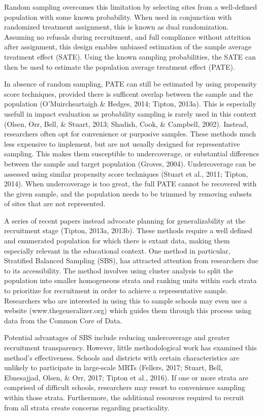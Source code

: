 \documentclass[man,floatsintext]{apa6}
\theoremstyle{definition}
\theoremstyle{definition}
\theoremstyle{definition}
\theoremstyle{remark}
\begin{document}
Random sampling overcomes this limitation by selecting sites from a
well-defined population with some known probability. When used in
conjunction with randomized treatment assignment, this is known as dual
randomization. Assuming no refusals during recruitment, and full
compliance without attrition after assignment, this design enables
unbiased estimation of the sample average treatment effect (SATE). Using
the known sampling probabilities, the SATE can then be used to estimate
the population average treatment effect (PATE).

In absence of random sampling, PATE can still be estimated by using
propensity score techniques, provided there is sufficent overlap between
the sample and the population (O'Muircheartaigh \& Hedges, 2014; Tipton,
2013a). This is especially usefull in impact evaluation as probability
sampling is rarely used in this context (Olsen, Orr, Bell, \& Stuart,
2013; Shadish, Cook, \& Campbell, 2002). Instead, researchers often opt
for convenience or purposive samples. These methods much less expensive
to implement, but are not usually designed for representative sampling.
This makes them susceptible to undercoverage, or substantial differencs
between the sample and target population (Groves, 2004). Undercoverage
can be assessed using similar propensity score techniques (Stuart et
al., 2011; Tipton, 2014). When undercoverage is too great, the full PATE
cannot be recovered with the given sample, and the population needs to
be trimmed by removing subsets of sites that are not represented.

A series of recent papers instead advocate planning for generalizability
at the recruitment stage (Tipton, 2013a, 2013b). These methods require a
well defined and enumerated population for which there is extant data,
making them especially relevant in the educational context. One method
in particular, Stratified Balanced Sampling (SBS), has attracted
attention from researchers due to its accessibility. The method involves
using cluster analysis to split the population into smaller homogeneous
strata and ranking units within each strata to prioritize for
recruitment in order to achieve a representative sample. Researchers who
are interested in using this to sample schools may even use a website
(www.thegeneralizer.org) which guides them through this process using
data from the Common Core of Data.

Potential advantages of SBS include reducing undercoverage and greater
recruitment transparency. However, little methodological work has
examined this method's effectiveness. Schools and districts with certain
characteristics are unlikely to participate in large-scale MRTs
(Fellers, 2017; Stuart, Bell, Ebnesajjad, Olsen, \& Orr, 2017; Tipton et
al., 2016). If one or more strata are comprised of difficult schools,
researchers may resort to convenience sampling within those strata.
Furthermore, the additional resources required to recruit from all
strata create concerns regarding practicality.
\end{document}
